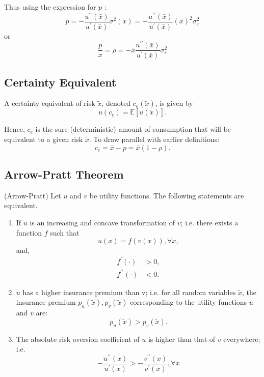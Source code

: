\documentclass[10pt]{article}
\begin{document}
Thus using the expression for $p$ :
$$
p=-\frac{u^{\prime \prime}(\bar{x})}{u^{\prime}(\bar{x})} \sigma^2(x)=-\frac{u^{\prime \prime}(\bar{x})}{u^{\prime}(\bar{x})}(\bar{x})^2 \sigma_{\varepsilon}^2
$$
or
$$
\frac{p}{x}=\rho=-\bar{x} \frac{u^{\prime \prime}(\bar{x})}{u^{\prime}(\bar{x})} \sigma_{\varepsilon}^2
$$

\subsection{Certainty Equivalent}

\begin{definition}
    
    A certainty equivalent of risk $\tilde{x}$, denoted $c_e(\tilde{x})$, is given by
    $$
    u\left(c_e\right)=\mathbb{E}[u(\tilde{x})] .
    $$

    Hence, $c_e$ is the sure (deterministic) amount of consumption that will be equivalent to a given risk $\tilde{x}$. 
    To draw parallel with earlier definitions:
    $$
    c_e=\bar{x}-p=\bar{x}(1-\rho) .
    $$
     
\end{definition}

\subsection{Arrow-Pratt Theorem}

\begin{theorem}
    (Arrow-Pratt) Let $u$ and $v$ be utility functions. The following statements are equivalent.
    
    \begin{enumerate}
        \item  If $u$ is an increasing and concave transformation of $v$; i.e. there exists a function $f$ such that
        $$
        u(x)=f(v(x)), \forall x,
        $$
        and,
        $$
        \begin{aligned}
        f^{\prime}(\cdot) & >0, \\
        f^{\prime \prime}(\cdot) & <0 .
        \end{aligned}
        $$
        \item $u$ has a higher insurance premium than v; i.e. for all random variables $\tilde{x}$, the insurance premium $p_u(\tilde{x}), p_v(\tilde{x})$ corresponding to the utility functions $u$ and $v$ are:
        $$
        p_u(\tilde{x})>p_v(\tilde{x}) .
        $$
        \item The absolute risk aversion coefficient of $u$ is higher than that of $v$ everywhere; i.e.
        $$
        -\frac{u^{\prime \prime}(x)}{u^{\prime}(x)}>-\frac{v^{\prime \prime}(x)}{v^{\prime}(x)}, \forall x
        $$
    \end{enumerate}

\end{theorem}
\end{document}
